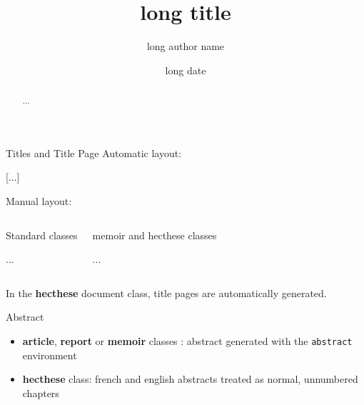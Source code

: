 \begin{frame}[fragile]{Titles and Title Page}
	Automatic layout:
\begin{codesource}
	\title[short title]{long title}
	\author[short author name]{long author name}
	\date[short date]{long date}
	[...]
	
	\maketitle
\end{codesource}

	Manual layout:
		\begin{columns}
			\begin{HECcomparaison}{Standard classes}
\begin{codesource}
	\begin{titlepage}
		...
	\end{titlepage}
\end{codesource}
			\end{HECcomparaison}
			\begin{HECcomparaison}{memoir and hecthese classes}
\begin{codesource}
	\begin{titlingpage}
		...
	\end{titlingpage}
\end{codesource}	
			\end{HECcomparaison}
		\end{columns}
	
	In the \textbf{hecthese} document class, title pages are automatically generated.
\end{frame}

\begin{frame}[fragile,c]{Abstract}
	\begin{itemize}
		\item \textbf{article}, \textbf{report} or \textbf{memoir} classes : abstract generated with the
		\lstinline|abstract| environment
\begin{codesource}
	\begin{abstract}
		...
	\end{abstract}
\end{codesource}

		\item \textbf{hecthese} class: french and english abstracts treated as normal, unnumbered chapters
	\end{itemize}
\end{frame}

